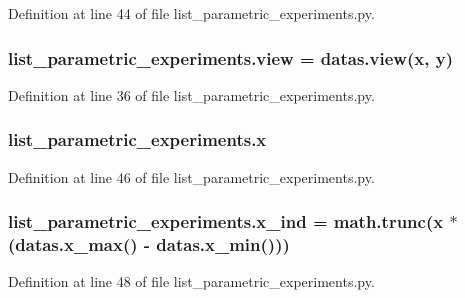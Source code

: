 Definition at line 44 of file list\+\_\+parametric\+\_\+experiments.\+py.

\subsubsection[{\texorpdfstring{view}{view}}]{\setlength{\rightskip}{0pt plus 5cm}list\+\_\+parametric\+\_\+experiments.\+view = datas.\+view({\bf x}, {\bf y})}\hypertarget{namespacelist__parametric__experiments_a9683eb49d1e277163cdce473eab93bfe}{}\label{namespacelist__parametric__experiments_a9683eb49d1e277163cdce473eab93bfe}


Definition at line 36 of file list\+\_\+parametric\+\_\+experiments.\+py.

\subsubsection[{\texorpdfstring{x}{x}}]{\setlength{\rightskip}{0pt plus 5cm}list\+\_\+parametric\+\_\+experiments.\+x}\hypertarget{namespacelist__parametric__experiments_a2209c6639b1c307f8a8b47b1f2127e39}{}\label{namespacelist__parametric__experiments_a2209c6639b1c307f8a8b47b1f2127e39}


Definition at line 46 of file list\+\_\+parametric\+\_\+experiments.\+py.

\subsubsection[{\texorpdfstring{x\+\_\+ind}{x_ind}}]{\setlength{\rightskip}{0pt plus 5cm}list\+\_\+parametric\+\_\+experiments.\+x\+\_\+ind = math.\+trunc({\bf x} $\ast$ (datas.\+x\+\_\+max() -\/ datas.\+x\+\_\+min()))}\hypertarget{namespacelist__parametric__experiments_a55fb8ae8e39b6f4d8187b6ca247f8070}{}\label{namespacelist__parametric__experiments_a55fb8ae8e39b6f4d8187b6ca247f8070}


Definition at line 48 of file list\+\_\+parametric\+\_\+experiments.\+py.

